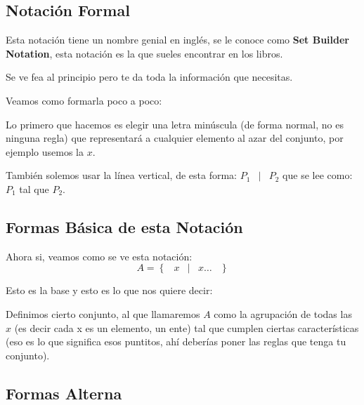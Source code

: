 \documentclass[12pt, fleqn]{report}                             %
\DeclareMathOperator \Space {\quad}                             %
\DeclareMathOperator \MiniSpace {\;}                            %
\newcommand \Such {\MiniSpace|\MiniSpace}                       %
\newcommand{\Set}[1]{\left\{ \MiniSpace #1 \MiniSpace \right\}} %
\begin{document}
            \clearpage
            \subsection{Notación Formal} 

                Esta notación tiene un nombre genial en inglés, se le conoce como
                \textbf{Set Builder Notation}, esta notación es la que sueles encontrar en los libros. 

                Se ve fea al principio pero te da toda la información que necesitas.

                Veamos como formarla poco a poco:

                Lo primero que hacemos es elegir una letra minúscula (de forma normal, no es ninguna regla)
                que representará a cualquier elemento al azar del conjunto, por ejemplo usemos la $x$.

                También solemos usar la línea vertical, de esta forma: $P_1 \Such P_2$ que se lee como: 
                $P_1$ tal que $P_2$.  


                \subsection*{Formas Básica de esta Notación}

                    Ahora si, veamos como se ve esta notación:
                    \begin{equation*}   
                        A = \Set{ x \Such x \dots }
                    \end{equation*}

                    Esto es la base y esto es lo que nos quiere decir:

                    Definimos cierto conjunto, al que llamaremos $A$ como la agrupación de todas las $x$
                    (es decir cada x es un elemento, un ente) tal que cumplen ciertas características
                    (eso es lo que significa esos puntitos, ahí deberías poner las reglas que tenga
                    tu conjunto).

                \subsection{Formas Alterna}
                
\end{document}
